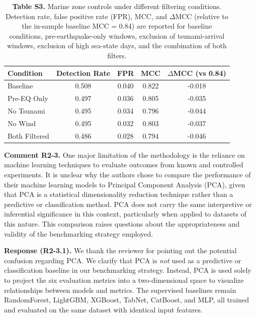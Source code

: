 \documentclass[12pt]{article}
\newcommand{\revcomment}[1]{\begingroup\color{commentcolor}#1\endgroup}
\newcommand{\revresponse}[1]{\begingroup\color{responsecolor}#1\endgroup}
\begin{document}
{\begin{table}[H]
\small
\centering
\caption*{\textbf{Table S3.} Marine zone controls under different filtering conditions. Detection rate, false positive rate (FPR), MCC, and $\Delta$MCC (relative to the in-sample baseline MCC = 0.84) are reported for baseline conditions, pre-earthquake-only windows, exclusion of tsunami-arrival windows, exclusion of high sea-state days, and the combination of both filters.}
\begin{tabular}{@{}lcccc@{}}
\toprule
Condition      & Detection Rate & FPR   & MCC   & $\Delta$MCC (vs 0.84) \\
\midrule
Baseline       & 0.508          & 0.040 & 0.822 & -0.018                \\
Pre-EQ Only    & 0.497          & 0.036 & 0.805 & -0.035                \\
No Tsunami     & 0.495          & 0.034 & 0.796 & -0.044                \\
No Wind        & 0.495          & 0.032 & 0.803 & -0.037                \\
Both Filtered  & 0.486          & 0.028 & 0.794 & -0.046                \\
\bottomrule
\end{tabular}
\end{table}
}

\bigskip

\bigskip

\revcomment{%
\textbf{Comment R2-3.} One major limitation of the methodology is the reliance on machine learning techniques to evaluate outcomes from known and controlled experiments. It is unclear why the authors chose to compare the performance of their machine learning models to Principal Component Analysis (PCA), given that PCA is a statistical dimensionality reduction technique rather than a predictive or classification method. PCA does not carry the same interpretive or inferential significance in this context, particularly when applied to datasets of this nature. This comparison raises questions about the appropriateness and validity of the benchmarking strategy employed.
}

\revresponse{%
\textbf{Response (R2-3.1).} We thank the reviewer for pointing out the potential confusion regarding PCA. We clarify that PCA is \emph{not} used as a predictive or classification baseline in our benchmarking strategy. Instead, PCA is used solely to project the six evaluation metrics into a two-dimensional space to visualize relationships between models and metrics. The supervised baselines remain RandomForest, LightGBM, XGBoost, TabNet, CatBoost, and MLP, all trained and evaluated on the same dataset with identical input features.
}
\end{document}
